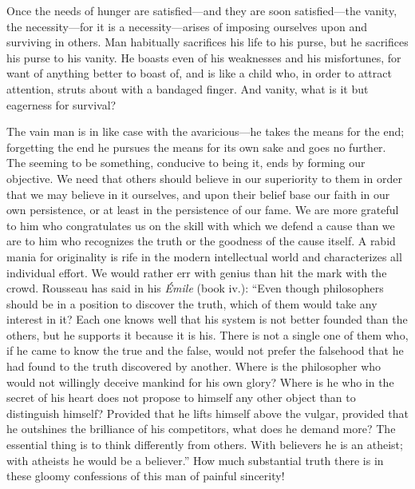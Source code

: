 Once the needs of hunger are sat\-is\-fied---and they are soon
sat\-is\-fied---the vanity, the necessity---for it is a
ne\-ces\-si\-ty---a\-ris\-es of imposing ourselves upon and surviving
in others. Man habitually sacrifices his life to his purse, but he
sacrifices his purse to his vanity. He boasts even of his weaknesses
and his misfortunes, for want of anything better to boast of, and is
like a child who, in order  to attract attention, struts
about with a bandaged finger. And vanity, what is it but eagerness for
survival?

The vain man is in like case with the av\-a\-ri\-cious---he takes the
means for the end; forgetting the end he pursues the means for its own
sake and goes no further. The seeming to be something, conducive to
being it, ends by forming our objective. We need that others should
believe in our superiority to them in order that we may believe in it
ourselves, and upon their belief base our faith in our own
persistence, or at least in the persistence of our fame. We are more
grateful to him who congratulates us on the skill with which we defend
a cause than we are to him who recognizes the truth or the goodness of
the cause itself. A rabid mania for originality is rife in the modern
intellectual world and characterizes all individual effort. We would
rather err with genius than hit the mark with the crowd. Rousseau has
said in his \textit{\'Emile} (book iv.): ``Even though philosophers
should be in a position to discover the truth, which of them would
take any interest in it? Each one knows well that his system is not
better founded than the others, but he supports it because it is his.
There is not a single one of them who, if he came to know the true and
the false, would not prefer the falsehood that he had found to the
truth discovered by another. Where is the philosopher who would not
willingly deceive mankind for his own glory? Where is he who in the
secret of his heart does not propose to himself any other object than
to distinguish himself? Provided that he lifts himself above the
vulgar, provided that he outshines the brilliance of his competitors,
what does he demand more? The essential thing is to think differently
from others. With believers he is an atheist; with atheists he would
be a believer.'' How much substantial truth there is in these gloomy
confessions of this man of painful sincerity!

